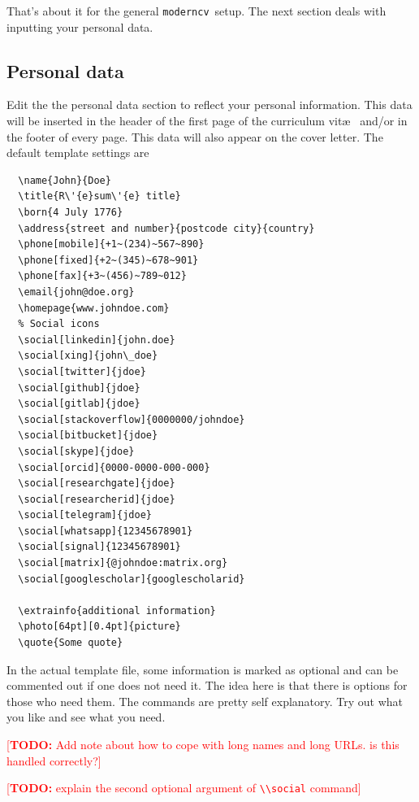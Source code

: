 \documentclass[a4paper,11pt]{article}
\newcommand{\todo}[1]{\marginpar{\raggedright \textcolor{red}{[\textbf{TODO:} #1]}}}
\newcommand{\todox}[1]{\textcolor{red}{[\textbf{TODO:} #1]}}
\newcommand{\code}[1]{\lstinline!#1!}
\newcommand{\Code}[1]{\lstinline!#1!~} %
\newcommand{\Moderncv}{\Code{moderncv}}
\begin{document}
That's about it for the general \Moderncv setup.
The next section deals with inputting your personal data.

\subsection{Personal data}
Edit the the personal data section to reflect your personal information. This data will be inserted in the header of the first page of the curriculum vit\ae~ and/or in the footer of every page.
This data will also appear on the cover letter.
The default template settings are

\begin{lstlisting}
  \name{John}{Doe}
  \title{R\'{e}sum\'{e} title}
  \born{4 July 1776}
  \address{street and number}{postcode city}{country}
  \phone[mobile]{+1~(234)~567~890}
  \phone[fixed]{+2~(345)~678~901}
  \phone[fax]{+3~(456)~789~012}
  \email{john@doe.org}
  \homepage{www.johndoe.com}
  % Social icons
  \social[linkedin]{john.doe}
  \social[xing]{john\_doe}
  \social[twitter]{jdoe}
  \social[github]{jdoe}
  \social[gitlab]{jdoe}
  \social[stackoverflow]{0000000/johndoe}
  \social[bitbucket]{jdoe}
  \social[skype]{jdoe}
  \social[orcid]{0000-0000-000-000}
  \social[researchgate]{jdoe}
  \social[researcherid]{jdoe}
  \social[telegram]{jdoe}
  \social[whatsapp]{12345678901}
  \social[signal]{12345678901}
  \social[matrix]{@johndoe:matrix.org}
  \social[googlescholar]{googlescholarid}

  \extrainfo{additional information}
  \photo[64pt][0.4pt]{picture}
  \quote{Some quote}
\end{lstlisting}
\todo{explain adding pictures}
In the actual template file, some information is marked as optional and can be commented out if one does not need it.
The idea here is that there is options for those who need them.
The commands are pretty self explanatory. Try out what you like and see what you need.

\todox{Add note about how to cope with long names and long URLs. is this handled correctly?}

\todox{explain the second optional argument of \code{\\social} command}
\end{document}
